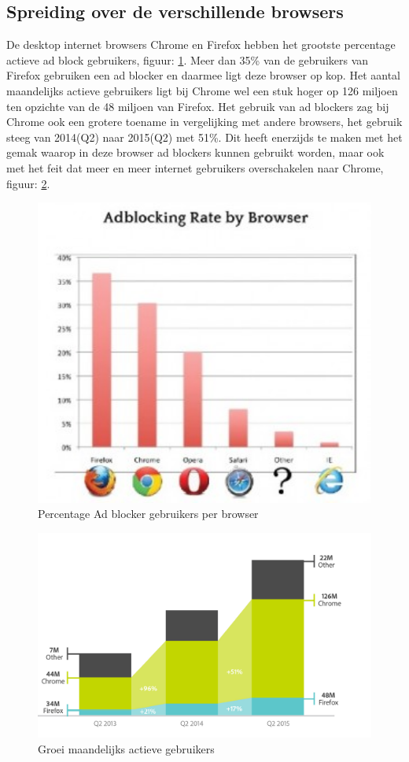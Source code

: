 \documentclass[pdftex,a4paper,12pt,twoside]{report}
\begin{document}
\subsection{Spreiding over de verschillende browsers}
\label{sec spreiding over de verschillende browsers}
De desktop internet browsers Chrome en Firefox hebben het grootste percentage actieve ad block gebruikers, figuur: \ref{fig: Ad-blocking-by-browse}. Meer dan 35\% van de gebruikers van Firefox gebruiken een ad blocker en daarmee ligt deze browser op kop. Het aantal maandelijks actieve gebruikers ligt bij Chrome wel een stuk hoger op 126 miljoen ten opzichte van de 48 miljoen van Firefox. Het gebruik van ad blockers zag bij Chrome ook een grotere toename in vergelijking met andere browsers, het gebruik steeg van 2014(Q2) naar 2015(Q2) met 51\%. Dit heeft enerzijds te maken met het gemak waarop in deze browser ad blockers kunnen gebruikt worden, maar ook met het feit dat meer en meer internet gebruikers overschakelen naar Chrome, figuur: \ref{fig: UsersPerBrowser}.
\begin{figure}[h!]
\centering
\includegraphics[width=12cm]{img/Ad-blocking-by-browse}
\caption{Percentage Ad blocker gebruikers per browser}
\label{fig: Ad-blocking-by-browse}
\end{figure}

\begin{figure}[h!]
\centering
\includegraphics[width=12cm]{img/UsersPerBrowser}
\caption{Groei maandelijks actieve gebruikers}
\label{fig: UsersPerBrowser}
\end{figure}
\end{document}
